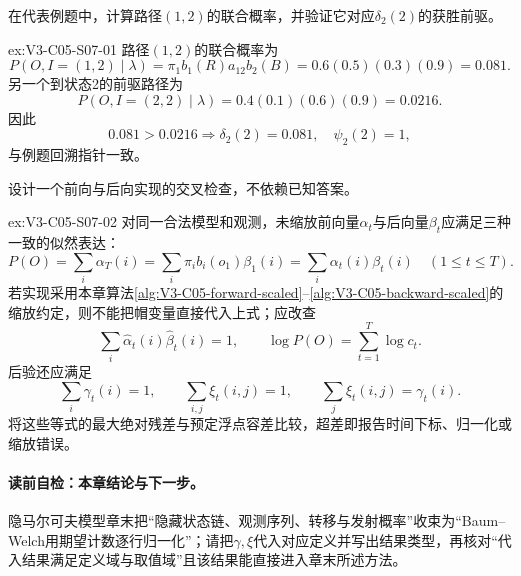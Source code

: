 \begin{SLChapterExercisePairSection}
\begin{exercise}\label{ex:V3-C05-S07-01}
在代表例题中，计算路径$(1,2)$的联合概率，并验证它对应$\delta_2(2)$的获胜前驱。
\end{exercise}
\ifSLFullEdition
{}\label{sol:V3-C05-S07-01}
\begin{chapterexercisesolution}{ex:V3-C05-S07-01}
路径$(1,2)$的联合概率为
\[
P(O,I=(1,2)\mid\lambda)
=\pi_1b_1(R)a_{12}b_2(B)
=0.6(0.5)(0.3)(0.9)=0.081.
\]
另一个到状态2的前驱路径为
\[
P(O,I=(2,2)\mid\lambda)
=0.4(0.1)(0.6)(0.9)=0.0216.
\]
因此
\[
0.081>0.0216
\Longrightarrow \delta_2(2)=0.081,\quad\psi_2(2)=1,
\]
与例题回溯指针一致。
\end{chapterexercisesolution}
\fi

\begin{exercise}\label{ex:V3-C05-S07-02}
设计一个前向与后向实现的交叉检查，不依赖已知答案。
\end{exercise}
\ifSLFullEdition
{}\label{sol:V3-C05-S07-02}
\begin{chapterexercisesolution}{ex:V3-C05-S07-02}
对同一合法模型和观测，未缩放前向量$\alpha_t$与后向量$\beta_t$应满足三种一致的似然表达：
\[
P(O)=\sum_i\alpha_T(i)
=\sum_i\pi_i b_i(o_1)\beta_1(i)
=\sum_i\alpha_t(i)\beta_t(i)\quad(1\leq t\leq T).
\]
若实现采用本章算法\ref{alg:V3-C05-forward-scaled}--\ref{alg:V3-C05-backward-scaled}的缩放约定，则不能把帽变量直接代入上式；应改查
\[
\sum_i\widehat\alpha_t(i)\widehat\beta_t(i)=1,
\qquad
\log P(O)=\sum_{t=1}^{T}\log c_t.
\]
后验还应满足
\[
\sum_i\gamma_t(i)=1,
\qquad
\sum_{i,j}\xi_t(i,j)=1,
\qquad
\sum_j\xi_t(i,j)=\gamma_t(i).
\]
将这些等式的最大绝对残差与预定浮点容差比较，超差即报告时间下标、归一化或缩放错误。
\end{chapterexercisesolution}
\fi

\end{SLChapterExercisePairSection}
\paragraph{读前自检：本章结论与下一步。}隐马尔可夫模型章末把“隐藏状态链、观测序列、转移与发射概率”收束为“Baum--Welch用期望计数逐行归一化”；请把$\gamma,\xi$代入对应定义并写出结果类型，再核对“代入结果满足定义域与取值域”且该结果能直接进入章末所述方法。\par

